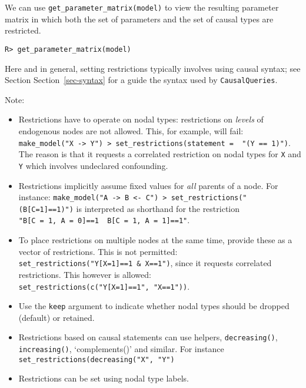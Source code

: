\documentclass[
  11pt,
  article]{jss}
\providecommand{\tightlist}{%
  \setlength{\itemsep}{0pt}\setlength{\parskip}{0pt}}\usepackage{longtable,booktabs,array}
\begin{document}
\begin{table}

\end{table}

We can use \texttt{get\_parameter\_matrix(model)} to view the resulting
parameter matrix in which both the set of parameters and the set of
causal types are restricted.

\begin{verbatim}
R> get_parameter_matrix(model)
\end{verbatim}

Here and in general, setting restrictions typically involves using
causal syntax; see Section Section~\ref{sec-syntax} for a guide the
syntax used by \texttt{CausalQueries}.

Note:

\begin{itemize}
\tightlist
\item
  Restrictions have to operate on nodal types: restrictions on
  \emph{levels} of endogenous nodes are not allowed. This, for example,
  will fail:
  \texttt{make\_model("X\ -\textgreater{}\ Y")\ \textbar{}\textgreater{}\ set\_restrictions(statement\ =\ \ "(Y\ ==\ 1)")}.
  The reason is that it requests a correlated restriction on nodal types
  for \texttt{X} and \texttt{Y} which involves undeclared confounding.
\item
  Restrictions implicitly assume fixed values for \emph{all} parents of
  a node. For instance:
  \texttt{make\_model("A\ -\textgreater{}\ B\ \textless{}-\ C")\ \textbar{}\textgreater{}\ set\_restrictions("(B{[}C=1{]}==1)")}
  is interpreted as shorthand for the restriction
  \texttt{"B{[}C\ =\ 1,\ A\ =\ 0{]}==1\ \textbar{}\ B{[}C\ =\ 1,\ A\ =\ 1{]}==1"}.
\item
  To place restrictions on multiple nodes at the same time, provide
  these as a vector of restrictions. This is not permitted:
  \texttt{set\_restrictions("Y{[}X=1{]}==1\ \&\ X==1")}, since it
  requests correlated restrictions. This however is allowed:
  \texttt{set\_restrictions(c("Y{[}X=1{]}==1",\ "X==1"))}.\\
\item
  Use the \texttt{keep} argument to indicate whether nodal types should
  be dropped (default) or retained.
\item
  Restrictions based on causal statements can use helpers,
  \texttt{decreasing()}, \texttt{increasing()}, `complements()' and
  similar. For instance \texttt{set\_restrictions(decreasing("X",\ "Y")}
\item
  Restrictions can be set using nodal type labels.
\end{itemize}
\end{document}
